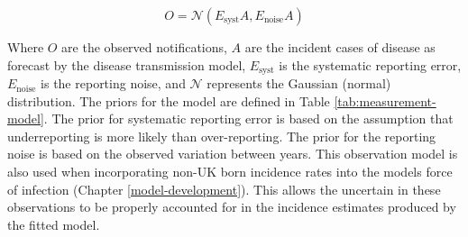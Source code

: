 \documentclass[11pt,twoside]{bristolthesis}
\begin{document}
  \[O = \mathcal{N}\left(E_{\text{syst}}A, E_{\text{noise}}A\right)\]
  
  Where \(O\) are the observed notifications, \(A\) are the incident cases of disease as forecast by the disease transmission model, \(E_{\text{syst}}\) is the systematic reporting error, \(E_{\text{noise}}\) is the reporting noise, and \(\mathcal{N}\) represents the Gaussian (normal) distribution. The priors for the model are defined in Table \ref{tab:measurement-model}. The prior for systematic reporting error is based on the assumption that underreporting is more likely than over-reporting. The prior for the reporting noise is based on the observed variation between years. This observation model is also used when incorporating non-UK born incidence rates into the models force of infection (Chapter \ref{model-development}). This allows the uncertain in these observations to be properly accounted for in the incidence estimates produced by the fitted model.
  
\end{document}
